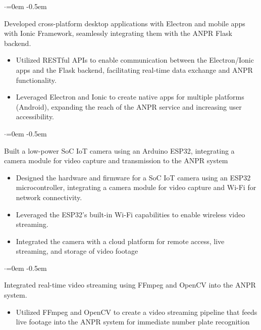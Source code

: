 \documentclass{article}
\begin{document}
\begin{list}{$\cdot$}{\leftmargin=0em} %
    \itemsep -0.5em \vspace{-0.5em} %
    \item  Developed cross-platform desktop applications with Electron and mobile apps with Ionic Framework, seamlessly
    integrating them with the ANPR Flask backend.
\end{list}

\vspace{-1.6em}
\begin{itemize}
    \item Utilized RESTful APIs to enable communication between the Electron/Ionic apps and the Flask backend, facilitating real-time data exchange and ANPR functionality.
    \item Leveraged Electron and Ionic to create native apps for multiple platforms (Android), expanding the reach of the ANPR service and increasing user accessibility.
\end{itemize}


\begin{list}{$\cdot$}{\leftmargin=0em} %
    \itemsep -0.5em \vspace{-0.5em} %
    \item Built a low-power SoC IoT camera using an Arduino ESP32, integrating a camera module for video
    capture and transmission to the ANPR system
\end{list}

\vspace{-1.6em}
\begin{itemize}
    \item Designed the hardware and firmware for a SoC IoT camera using an ESP32 microcontroller, integrating a camera module for video capture and Wi-Fi for network connectivity.
    \item Leveraged the ESP32's built-in Wi-Fi capabilities to enable wireless video streaming. 
    \item Integrated the camera with a cloud platform for remote access, live streaming, and storage of video footage
\end{itemize}


\begin{list}{$\cdot$}{\leftmargin=0em} %
    \itemsep -0.5em \vspace{-0.5em} %
    \item Integrated real-time video streaming using FFmpeg and OpenCV into the ANPR system.
\end{list}

\vspace{-1.6em}
\begin{itemize}
    \item Utilized FFmpeg and OpenCV to create a video streaming pipeline that feeds live footage into the ANPR system for immediate number plate recognition
\end{itemize}
\end{document}
